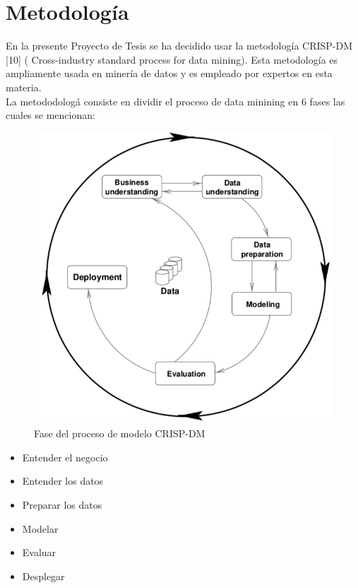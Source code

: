 %
\chapter{Metodolog\'ia}

En la presente Proyecto de Tesis se ha decidido usar la metodolog\'ia  CRISP-DM [10] ( Cross-industry standard process for data mining). Esta metodolog\'ia es ampliamente usada en miner\'ia de datos y es empleado por expertos en esta materia. \\

La metododolog\'a consiste en dividir el proceso de data minining en 6 fases las cuales se mencionan:



\begin{figure}[H]
\centering
\includegraphics[scale=0.4]{chapters/img/Ch06_CRISP.PNG}
\caption{Fase del proceso de modelo CRISP-DM}
\end{figure}

\begin{itemize}
\item Entender el negocio
\item Entender los datos
\item Preparar los datos
\item Modelar
\item Evaluar
\item Desplegar
\end{itemize}


